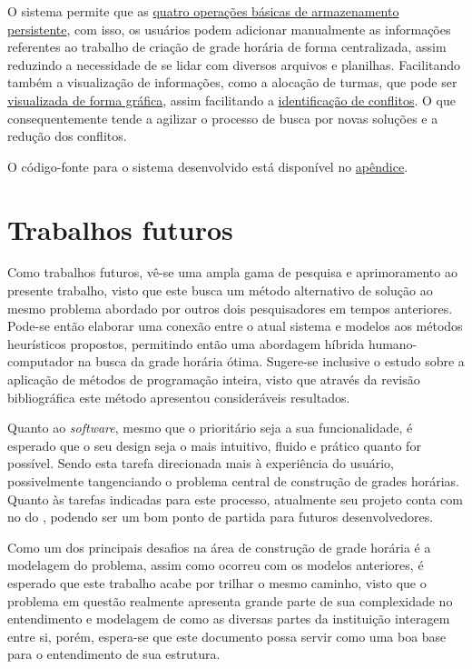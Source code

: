 O sistema permite que as \hyperref[sssec:Funcionalidades Iniciais]{quatro operações básicas de armazenamento persistente}, com isso, os usuários podem adicionar manualmente as informações referentes ao trabalho de criação de grade horária de forma centralizada, assim reduzindo a necessidade de se lidar com diversos arquivos e planilhas. Facilitando também a visualização de informações, como a alocação de turmas, que pode ser \hyperref[fig:pagina_multiFiltros]{visualizada de forma gráfica}, assim facilitando a \hyperref[sec:conflitos]{identificação de conflitos}. O que consequentemente tende a agilizar o processo de busca por novas soluções e a redução dos conflitos.

O código-fonte para o sistema desenvolvido está disponível no \hyperref[apendice:CodigoFonte]{apêndice}.

\section{Trabalhos futuros} %

Como trabalhos futuros, vê-se uma ampla gama de pesquisa e aprimoramento ao presente trabalho, visto que este busca um método alternativo de solução ao mesmo problema abordado por outros dois pesquisadores em tempos anteriores. Pode-se então elaborar uma conexão entre o atual sistema e modelos aos métodos heurísticos propostos, permitindo então uma abordagem híbrida humano-computador na busca da grade horária ótima. Sugere-se inclusive o estudo sobre a aplicação de métodos de programação inteira, visto que através da revisão bibliográfica este método apresentou consideráveis resultados.

Quanto ao \textit{software}, mesmo que o prioritário seja a sua funcionalidade, é esperado que o seu design seja o mais intuitivo, fluido e prático quanto for possível. Sendo esta tarefa direcionada mais à experiência do usuário, possivelmente tangenciando o problema central de construção de grades horárias. Quanto às tarefas indicadas para este processo, atualmente seu projeto conta com  no  do , podendo ser um bom ponto de partida para futuros desenvolvedores.

Como um dos principais desafios na área de construção de grade horária é a modelagem do problema, assim como ocorreu com os modelos anteriores, é esperado que este trabalho acabe por trilhar o mesmo caminho, visto que o problema em questão realmente apresenta grande parte de sua complexidade no entendimento e modelagem de como as diversas partes da instituição interagem entre si, porém, espera-se que este documento possa servir como uma boa base para o entendimento de sua estrutura.

